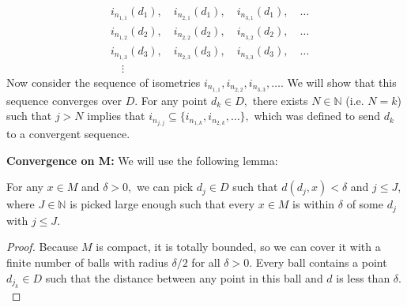 \documentclass{article}
\numberwithin{equation}{section}
\begin{document}
\begin{enumerate}
\begin{enumerate}[label=(\alph*)]
\begin{align}
            & i_{n_{1,1}}(d_1),\quad i_{n_{2,1}}(d_1),\quad i_{n_{3,1}}(d_1),\quad \dots\\
            & i_{n_{1,2}}(d_2),\quad i_{n_{2,2}}(d_2),\quad i_{n_{3,2}}(d_2),\quad \dots\\
            & i_{n_{1,3}}(d_3),\quad i_{n_{2,3}}(d_3),\quad i_{n_{3,3}}(d_3),\quad \dots\\
            & \quad\vdots
        \end{align}
        Now consider the sequence of isometries $i_{n_{1,1}},i_{n_{2,2}},i_{n_{3,3}},\dots.$ We will show that this sequence converges over $D.$ For any point $d_k \in D,$ there exists $N \in \mathbb{N}$ (i.e. $N=k$) such that $j>N$ implies that $i_{n_{j,j}} \subseteq \{i_{n_{1,k}},i_{n_{2,k}},\dots\},$ which was defined to send $d_k$ to a convergent sequence. 
        
        


        
        

        \textbf{Convergence on M:} We will use the following lemma:

        \begin{lemma}
            For any $x\in M$ and $\delta > 0,$ we can pick $d_j \in D$ such that $d(d_j,x) < \delta$ and $j \le J,$ where $J \in \mathbb{N}$ is picked large enough such that every $x\in M$ is within $\delta$ of some $d_j$ with $j \le J.$


            \begin{proof}
                Because $M$ is compact, it is totally bounded, so we can cover it with a finite number of balls with radius $\delta/2$ for all $\delta > 0.$ Every ball contains a point $d_{j_k}\in D$ such that the distance between any point in this ball and $d$ is less than $\delta.$
                \vspace{2mm}


\end{proof}
\end{lemma}
\end{enumerate}
\end{enumerate}
\end{document}
